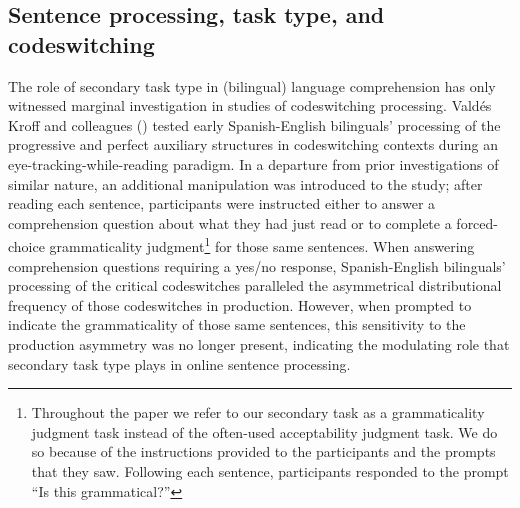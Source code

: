 \documentclass[output=paper,colorlinks,citecolor=brown]{langscibook}
\begin{document}
\subsection{Sentence processing, task type, and codeswitching}
The role of secondary task type in (bilingual) language comprehension has only witnessed marginal investigation in studies of codeswitching processing. Valdés Kroff and colleagues (\citeyear{ValdesKroffetal2018}) tested early Spanish-English bilinguals’ processing of the progressive and perfect auxiliary structures in codeswitching contexts during an eye-tracking-while-reading paradigm. In a departure from prior investigations of similar nature, an additional manipulation was introduced to the study; after reading each sentence, participants were instructed either to answer a comprehension question about what they had just read or to complete a forced-choice grammaticality judgment\footnote{Throughout the paper we refer to our secondary task as a grammaticality judgment task instead of the often-used acceptability judgment task. We do so because of the instructions provided to the participants and the prompts that they saw. Following each sentence, participants responded to the prompt ``Is this grammatical?''} for those same sentences. When answering comprehension questions requiring a yes/no response, Spanish-English bilinguals’ processing of the critical codeswitches paralleled the asymmetrical distributional frequency of those codeswitches in production. However, when prompted to indicate the grammaticality of those same sentences, this sensitivity to the production asymmetry was no longer present, indicating the modulating role that secondary task type plays in online sentence processing.
\end{document}
